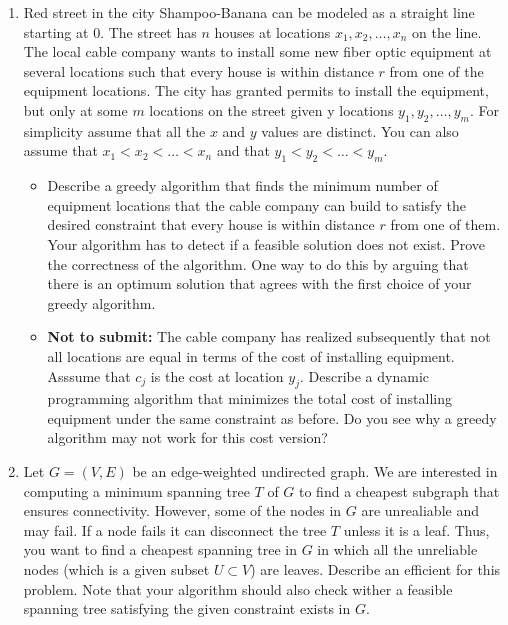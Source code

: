 \documentclass[11pt]{article}
\begin{document}
\vspace{1cm}

\begin{enumerate}


\item Red street in the city Shampoo-Banana can be modeled as a
  straight line starting at $0$.  The street has $n$ houses at
  locations $x_1,x_2,\ldots,x_n$ on the line. The local cable company
  wants to install some new fiber optic equipment at several locations
  such that every house is within distance $r$ from one of the
  equipment locations. The city has granted permits to install the
  equipment, but only at some $m$ locations on the street given y
  locations $y_1,y_2, \ldots,y_m$. For simplicity assume that all the
  $x$ and $y$ values are distinct. You can also assume that
  $x_1 < x_2 < \ldots < x_n$ and that $y_1 < y_2 < \ldots < y_m$.
  \begin{itemize}
  \item Describe a greedy algorithm that finds the minimum number of
    equipment locations that the cable company can build to satisfy
    the desired constraint that every house is within distance $r$
    from one of them.  Your algorithm has to detect if a feasible
    solution does not exist. Prove the correctness of the
    algorithm. One way to do this by arguing that there is an optimum
    solution that agrees with the first choice of your greedy
    algorithm.
  \item {\bf Not to submit:} The cable company has realized
    subsequently that not all locations are equal in terms of the cost
    of installing equipment. Asssume that $c_j$ is the cost at
    location $y_j$.  Describe a dynamic programming algorithm that
    minimizes the total cost of installing equipment under the same
    constraint as before. Do you see why a greedy algorithm may not
    work for this cost version?
  \end{itemize}


\item Let $G=(V,E)$ be an edge-weighted undirected graph.  We are
  interested in computing a minimum spanning tree $T$ of $G$ to find a
  cheapest subgraph that ensures connectivity.  However, some of the
  nodes in $G$ are unrealiable and may fail. If a node fails it can disconnect
  the tree $T$ unless it is a leaf. Thus, you want to find a cheapest 
  spanning tree in $G$ in which all the unreliable nodes (which is
  a given subset $U \subset V$) are leaves. Describe an efficient 
  for this problem. Note that your algorithm should also check wither
  a feasible spanning tree satisfying the given constraint exists in $G$.


\end{enumerate}
\end{document}
